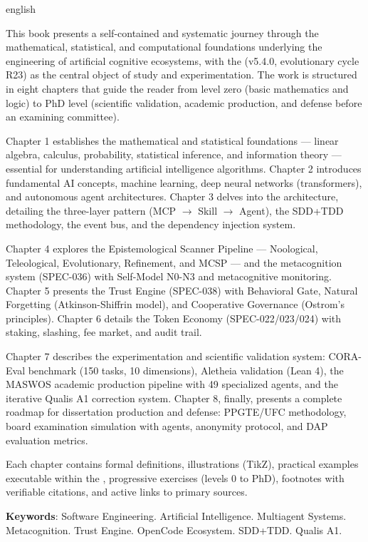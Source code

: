 \begin{otherlanguage*}{english}

This book presents a self-contained and systematic journey through the 
mathematical, statistical, and computational foundations underlying the 
engineering of artificial cognitive ecosystems, with the \opencodeeco{} 
(v5.4.0, evolutionary cycle R23) as the central object of study and 
experimentation. The work is structured in eight chapters that guide the 
reader from level zero (basic mathematics and logic) to PhD level 
(scientific validation, \qualisA{} academic production, and defense 
before an examining committee).

Chapter 1 establishes the mathematical and statistical foundations --- 
linear algebra, calculus, probability, statistical inference, and 
information theory --- essential for understanding artificial intelligence 
algorithms. Chapter 2 introduces fundamental AI concepts, machine learning, 
deep neural networks (transformers), and autonomous agent architectures. 
Chapter 3 delves into the \opencodeeco{} architecture, detailing the 
three-layer pattern (MCP $\rightarrow$ Skill $\rightarrow$ Agent), the 
SDD+TDD methodology, the event bus, and the dependency injection system.

Chapter 4 explores the Epistemological Scanner Pipeline --- Noological, 
Teleological, Evolutionary, Refinement, and MCSP --- and the metacognition 
system (SPEC-036) with Self-Model N0-N3 and metacognitive monitoring. 
Chapter 5 presents the Trust Engine (SPEC-038) with Behavioral Gate, 
Natural Forgetting (Atkinson-Shiffrin model), and Cooperative Governance 
(Ostrom's principles). Chapter 6 details the Token Economy 
(SPEC-022/023/024) with staking, slashing, fee market, and audit trail.

Chapter 7 describes the experimentation and scientific validation system: 
CORA-Eval benchmark (150 tasks, 10 dimensions), Aletheia validation 
(Lean 4), the MASWOS academic production pipeline with 49 specialized 
agents, and the iterative Qualis A1 correction system. Chapter 8, 
finally, presents a complete roadmap for dissertation production and 
defense: PPGTE/UFC methodology, board examination simulation with agents, 
anonymity protocol, and DAP evaluation metrics.

Each chapter contains formal definitions, illustrations (TikZ), practical 
examples executable within the \opencodeeco{}, progressive exercises 
(levels 0 to PhD), footnotes with verifiable citations, and active links 
to primary sources.

\medskip
\noindent\textbf{Keywords}: Software Engineering. Artificial Intelligence. 
Multiagent Systems. Metacognition. Trust Engine. OpenCode Ecosystem. 
SDD+TDD. Qualis A1.

\end{otherlanguage*}
